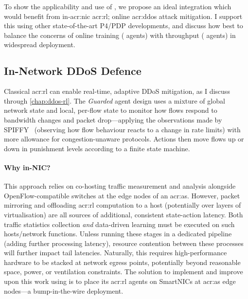 To show the applicability and use of \approachshort{}, we propose an ideal integration which would benefit from in-\gls{acr:nic} \gls{acr:rl}; online \gls{acr:ddos} attack mitigation.
I support this using other state-of-the-art P4/PDP developments, and discuss how best to balance the concerns of online training (\Coopfw{} agents) with throughput (\Indfw{} agents) in widespread deployment.


\subsection{In-Network DDoS Defence}\label{sec:integ-1}
Classical \gls{acr:rl} can enable real-time, adaptive DDoS mitigation, as I discuss through \cref{chap:ddos-rl}.
The \emph{Guarded} agent design uses a mixture of global network state and local, per-flow state to monitor how flows respond to bandwidth changes and packet drop---applying the observations made by SPIFFY~\parencite{DBLP:conf/ndss/KangGS16} (observing how flow behaviour reacts to a change in rate limits) with more allowance for congestion-unaware protocols.
Actions then move flows up or down in punishment levels according to a finite state machine.

\paragraph{Why in-NIC?}
This approach relies on co-hosting traffic measurement and analysis alongside OpenFlow-compatible switches at the edge nodes of an \gls{acr:as}.
However, packet mirroring and offloading \gls{acr:rl} computation to a host (potentially over layers of virtualisation) are all sources of additional, consistent state-action latency.
Both traffic statistics collection \emph{and} data-driven learning must be executed on such hosts/network functions.
Unless running these stages in a dedicated pipeline (adding further processing latency), resource contention between these processes will further impact tail latencies.
Naturally, this requires high-performance hardware to be stacked at network egress points, potentially beyond reasonable space, power, or ventilation constraints.
The solution to implement and improve upon this work using \approachshort{} is to place its \gls{acr:rl} agents on SmartNICs at \gls{acr:as} edge nodes---a bump-in-the-wire deployment.

